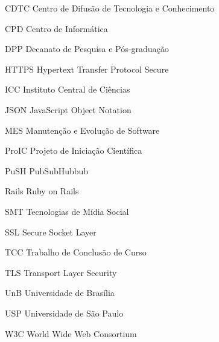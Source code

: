\begin{siglas}
  \item[CDTC] Centro de Difusão de Tecnologia e Conhecimento
  \item[CPD] Centro de Informática
  \item[DPP] Decanato de Pesquisa e Pós-graduação
  \item[HTTPS] Hypertext Transfer Protocol Secure
  \item[ICC] Instituto Central de Ciências
  \item[JSON] JavaScript Object Notation
  \item[MES] Manutenção e Evolução de Software
  \item[ProIC] Projeto de Iniciação Científica
  \item[PuSH] PubSubHubbub
  \item[Rails] Ruby on Rails
  \item[SMT] Tecnologias de Mídia Social
  \item[SSL] Secure Socket Layer
  \item[TCC] Trabalho de Conclusão de Curso
  \item[TLS] Transport Layer Security
  \item[UnB] Universidade de Brasília
  \item[USP] Universidade de São Paulo
  \item[W3C] World Wide Web Consortium
\end{siglas}
